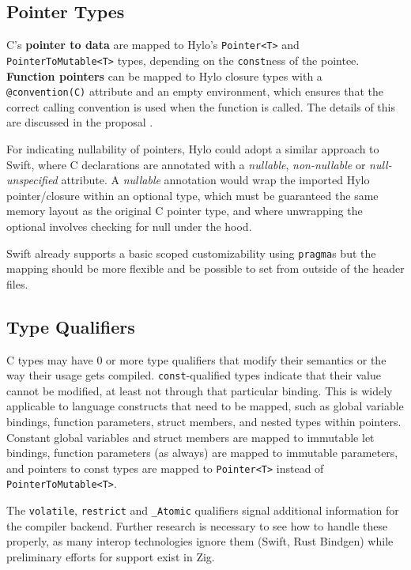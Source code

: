 \subsection{Pointer Types}
C's \textbf{pointer to data} are mapped to Hylo's \texttt{Pointer<T>} and \texttt{PointerToMutable<T>} types, depending on the \texttt{const}ness of the pointee. \textbf{Function pointers} can be mapped to Hylo closure types with a \texttt{@convention(C)} attribute and an empty environment, which ensures that the correct calling convention is used when the function is called. The details of this are discussed in the proposal \cite{hylo-function-pointers}.

For indicating nullability of pointers, Hylo could adopt a similar approach to Swift\cite{how-swift-imports-c-nullable}, where C declarations are annotated with a \textit{nullable}, \textit{non-nullable} or \textit{null-unspecified} attribute. A \textit{nullable} annotation would wrap the imported Hylo pointer/closure within an optional type, which must be guaranteed the same memory layout as the original C pointer type, and where unwrapping the optional involves checking for null under the hood.

Swift already supports a basic scoped customizability using \texttt{pragma}s but the mapping should be more flexible and be possible to set from outside of the header files.

\subsection{Type Qualifiers}
C types may have 0 or more type qualifiers that modify their semantics or the way their usage gets compiled. \texttt{const}-qualified types indicate that their value cannot be modified, at least not through that particular binding. This is widely applicable to language constructs that need to be mapped, such as global variable bindings, function parameters, struct members, and nested types within pointers. Constant global variables and struct members are mapped to immutable let bindings, function parameters (as always) are mapped to immutable parameters, and pointers to const types are mapped to \texttt{Pointer<T>} instead of \texttt{PointerToMutable<T>}.

The \texttt{volatile}, \texttt{restrict} and \texttt{\_Atomic} qualifiers signal additional information for the compiler backend. Further research is necessary to see how to handle these properly, as many interop technologies ignore them (Swift, Rust Bindgen) while preliminary efforts for support exist in Zig\cite{zig-qualifiers}.

